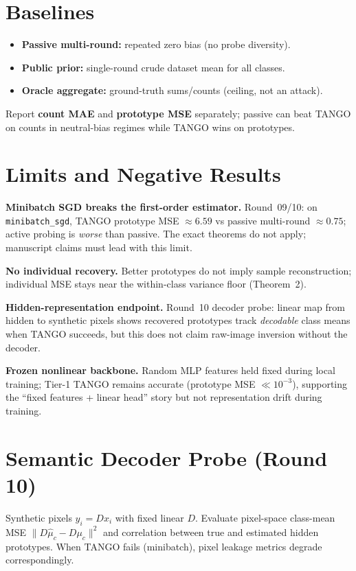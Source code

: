 \section{Baselines}
\label{sec:baselines}

\begin{itemize}
  \item \textbf{Passive multi-round:} repeated zero bias (no probe diversity).
  \item \textbf{Public prior:} single-round crude dataset mean for all classes.
  \item \textbf{Oracle aggregate:} ground-truth sums/counts (ceiling, not an attack).
\end{itemize}
Report \textbf{count MAE} and \textbf{prototype MSE} separately; passive can beat
TANGO on counts in neutral-bias regimes while TANGO wins on prototypes.

\section{Limits and Negative Results}
\label{sec:limits}

\textbf{Minibatch SGD breaks the first-order estimator.}
Round~09/10: on \texttt{minibatch\_sgd}, TANGO prototype MSE $\approx 6.59$ vs
passive multi-round $\approx 0.75$; active probing is \emph{worse} than passive.
The exact theorems do not apply; manuscript claims must lead with this limit.

\textbf{No individual recovery.} Better prototypes do not imply sample reconstruction;
individual MSE stays near the within-class variance floor (Theorem~2).

\textbf{Hidden-representation endpoint.} Round~10 decoder probe: linear map from hidden
to synthetic pixels shows recovered prototypes track \emph{decodable} class means when
TANGO succeeds, but this does not claim raw-image inversion without the decoder.

\textbf{Frozen nonlinear backbone.} Random MLP features held fixed during local training;
Tier-1 TANGO remains accurate (prototype MSE $\ll 10^{-3}$), supporting the
``fixed features + linear head'' story but not representation drift during training.

\section{Semantic Decoder Probe (Round 10)}
\label{sec:decoder}

Synthetic pixels $y_i = D x_i$ with fixed linear $D$.
Evaluate pixel-space class-mean MSE $\|D\hat\mu_c - D\mu_c\|^2$ and correlation
between true and estimated hidden prototypes.
When TANGO fails (minibatch), pixel leakage metrics degrade correspondingly.
